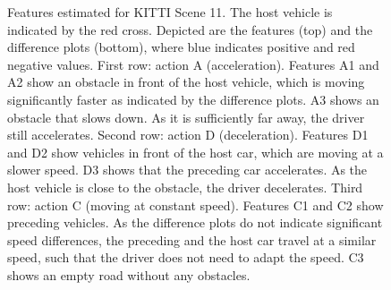 \documentclass{article}
\begin{document}
\begin{figure}
	\centering 	
	
	\caption{Features estimated for KITTI Scene 11. The host vehicle is indicated by the red cross. Depicted are the features (top) and the difference plots (bottom), where blue indicates positive and red negative values. First row: action A (acceleration). Features A1 and A2 show an obstacle in front of the host vehicle, which is moving significantly faster as indicated by the difference plots. A3 shows an obstacle that slows down. As it is sufficiently far away, the driver still accelerates. Second row: action D (deceleration). Features D1 and D2  show vehicles in front of the host car, which are moving at a slower speed. D3 shows that the preceding car accelerates. As the host vehicle is close to the obstacle, the driver decelerates. Third row: action C (moving at constant speed).  Features C1 and C2 show preceding vehicles. As the difference plots do not indicate significant speed differences, the preceding and the host car travel at a similar speed, such that the driver does not need to adapt the speed. C3 shows an empty road without any obstacles.}
	\label{fig::res::0011::feats}
\end{figure}
\end{document}
